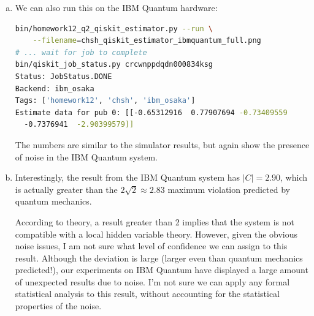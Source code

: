 \documentclass[12pt]{extarticle}
\begin{document}
\begin{enumerate}[(a)]
\item

We can also run this on the IBM Quantum hardware:

\begin{small}
\begin{lstlisting}[language=bash]
bin/homework12_q2_qiskit_estimator.py --run \
    --filename=chsh_qiskit_estimator_ibmquantum_full.png
# ... wait for job to complete
bin/qiskit_job_status.py crcwnppdqdn000834ksg
Status: JobStatus.DONE
Backend: ibm_osaka
Tags: ['homework12', 'chsh', 'ibm_osaka']
Estimate data for pub 0: [[-0.65312916  0.77907694 -0.73409559
  -0.7376941  -2.90399579]]
\end{lstlisting}
\end{small}

The numbers are similar to the simulator results, but again show the presence of noise in the IBM Quantum system.

\item

Interestingly, the result from the IBM Quantum system has $|C|=2.90$, which is actually greater than
the $2\sqrt{2}\approx 2.83$ maximum violation predicted by quantum mechanics.

According to theory, a result greater than 2 implies that the system is not compatible with a local hidden variable theory.
However, given the obvious noise issues, I am not sure what level of confidence we can assign to this result.
Although the deviation is large (larger even than quantum mechanics predicted!), our experiments on IBM Quantum
have displayed a large amount of unexpected results due to noise.
I'm not sure we can apply any formal statistical analysis to this result, without accounting for the statistical properties of the noise.

\end{enumerate}

\printbibliography
{}
\end{document}
